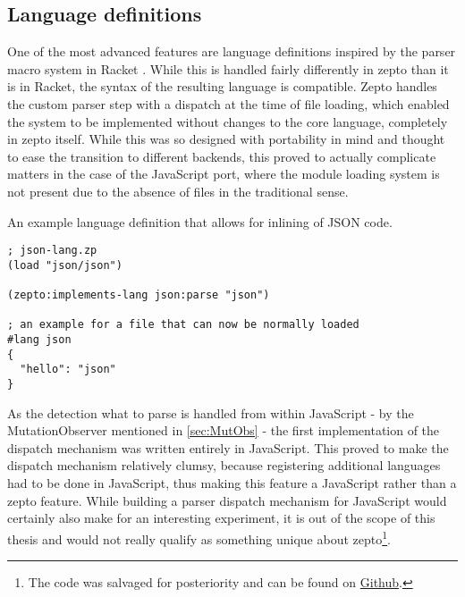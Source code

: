 \documentclass[oneside,11pt,xetex]{scrbook}
\begin{document}
\subsection{Language definitions}

One of the most advanced features are language definitions inspired by
the parser macro system in Racket \parencite{RPM}. While this is handled
fairly differently in zepto than it is in Racket, the syntax of the resulting
language is compatible. Zepto handles the custom parser step with a dispatch
at the time of file loading, which enabled the system to be implemented without
changes to the core language, completely in zepto itself. While this was so
designed with portability in mind and thought to ease the transition to
different backends, this proved to actually complicate matters in the case
of the JavaScript port, where the module loading system is not present due
to the absence of files in the traditional sense.

\begin{listing}[H]
\caption{An example language definition that allows for inlining of JSON code.}
\begin{verbatim}
; json-lang.zp
(load "json/json")

(zepto:implements-lang json:parse "json")

; an example for a file that can now be normally loaded
#lang json
{
  "hello": "json"
}
\end{verbatim}
\end{listing}

As the detection what to parse is handled from within JavaScript - by the
MutationObserver mentioned in \ref{sec:MutObs} - the first implementation
of the dispatch mechanism was written entirely in JavaScript. This proved
to make the dispatch mechanism relatively clumsy, because registering
additional languages had to be done in JavaScript, thus making this feature
a JavaScript rather than a zepto feature. While building a parser dispatch
mechanism for JavaScript would certainly also make for an interesting experiment,
it is out of the scope of this thesis and would not really qualify as something
unique about zepto\footnote{The code was salvaged for posteriority and can be
found on \href{https://github.com/hellerve/js-parse-dispatch}{Github}.}.



\clearpage

\end{document}
